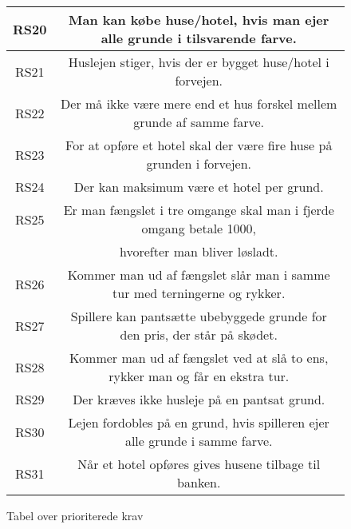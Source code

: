 \begin{figure}[H]
\begin{tabular}{ | c | c | }
\hline
RS20 & Man kan købe huse/hotel, hvis man ejer alle grunde i tilsvarende farve. \\
\hline
RS21 &  Huslejen stiger, hvis der er bygget huse/hotel i forvejen.\\ 
\hline
RS22 &  Der må ikke være mere end et hus forskel mellem grunde af samme farve. \\ 
\hline
RS23 & For at opføre et hotel skal der være fire huse på grunden i forvejen.\\ 
\hline
RS24 & Der kan maksimum være et hotel per grund. \\ 
\hline
RS25 &Er man fængslet i tre omgange skal man i fjerde omgang betale 1000, \\
& hvorefter man bliver løsladt. \\
\hline
RS26 &  Kommer man ud af fængslet slår man  i samme tur med terningerne og rykker. \\ 
\hline
RS27 & Spillere kan pantsætte ubebyggede grunde for den pris, der står på skødet. \\
\hline
RS28 & Kommer man ud af fængslet ved at slå to ens, rykker man og får en ekstra tur.\\
\hline
RS29 & Der kræves ikke husleje på en pantsat grund.\\
\hline
RS30 & Lejen fordobles på en grund, hvis spilleren ejer alle grunde i samme farve.\\
\hline
RS31 & Når et hotel opføres gives husene tilbage til banken. \\%
\hline
\end{tabular}
\caption{Tabel over prioriterede krav}
\label{Requirement list}
\end{figure}
